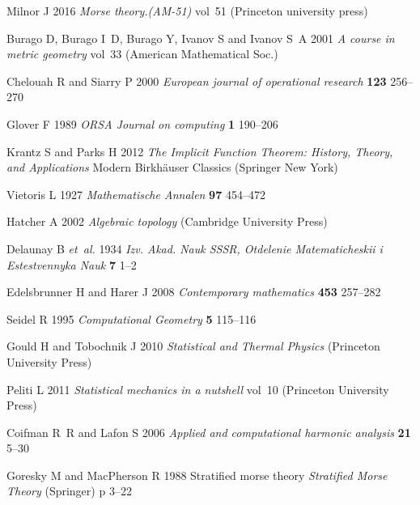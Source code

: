 \documentclass[default,iicol]{sn-jnl}%
\theoremstyle{thmstyleone}%
\theoremstyle{thmstyletwo}%
\theoremstyle{thmstylethree}%
\begin{document}
\begin{thebibliography}{10}
	Milnor J 2016 {\em Morse theory.(AM-51)\/} vol~51 (Princeton university press)
	
	Burago D, Burago I~D, Burago Y, Ivanov S and Ivanov S~A 2001 {\em A course in
		metric geometry\/} vol~33 (American Mathematical Soc.)
	
	Chelouah R and Siarry P 2000 {\em European journal of operational research\/}
	{\bf 123} 256–270
	
	Glover F 1989 {\em ORSA Journal on computing\/} {\bf 1} 190–206
	
	Krantz S and Parks H 2012 {\em The Implicit Function Theorem: History, Theory,
		and Applications\/} Modern Birkhäuser Classics (Springer New York)
	
	Vietoris L 1927 {\em Mathematische Annalen\/} {\bf 97} 454–472
	
	Hatcher A 2002 {\em Algebraic topology\/} (Cambridge University Press)
	
	Delaunay B {\em et~al.\/} 1934 {\em Izv. Akad. Nauk SSSR, Otdelenie
		Matematicheskii i Estestvennyka Nauk\/} {\bf 7} 1–2
	
	Edelsbrunner H and Harer J 2008 {\em Contemporary mathematics\/} {\bf 453}
	257--282
	
	Seidel R 1995 {\em Computational Geometry\/} {\bf 5} 115–116
	
	Gould H and Tobochnik J 2010 {\em Statistical and Thermal Physics\/} (Princeton
	University Press)
	
	Peliti L 2011 {\em Statistical mechanics in a nutshell\/} vol~10 (Princeton
	University Press)
	
	Coifman R~R and Lafon S 2006 {\em Applied and computational harmonic
		analysis\/} {\bf 21} 5–30
	
	Goresky M and MacPherson R 1988 Stratified morse theory {\em Stratified Morse
		Theory\/} (Springer) p 3–22
	
\end{thebibliography}
\end{document}
